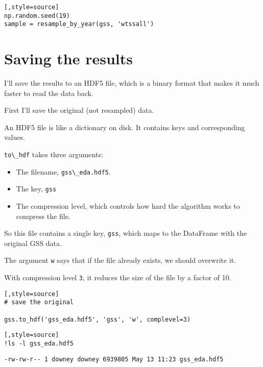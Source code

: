 \begin{lstlisting}[,style=source]
np.random.seed(19)
sample = resample_by_year(gss, 'wtssall')
\end{lstlisting}

\hypertarget{saving-the-results}{%
\section{Saving the results}\label{saving-the-results}}

I'll save the results to an HDF5 file, which is a binary format that
makes it much faster to read the data back.

First I'll save the original (not resampled) data.

An HDF5 file is like a dictionary on disk. It contains keys and
corresponding values.

\passthrough{\lstinline!to\_hdf!} takes three arguments:

\begin{itemize}
\item
  The filename, \passthrough{\lstinline!gss\_eda.hdf5!}.
\item
  The key, \passthrough{\lstinline!gss!}
\item
  The compression level, which controls how hard the algorithm works to
  compress the file.
\end{itemize}

So this file contains a single key, \passthrough{\lstinline!gss!}, which
maps to the DataFrame with the original GSS data.

The argument \passthrough{\lstinline!w!} says that if the file already
exists, we should overwrite it.

With compression level \passthrough{\lstinline!3!}, it reduces the size
of the file by a factor of 10.

\begin{lstlisting}[,style=source]
# save the original

gss.to_hdf('gss_eda.hdf5', 'gss', 'w', complevel=3)
\end{lstlisting}

\begin{lstlisting}[,style=source]
!ls -l gss_eda.hdf5
\end{lstlisting}

\begin{lstlisting}[style=output]
-rw-rw-r-- 1 downey downey 6939805 May 13 11:23 gss_eda.hdf5
\end{lstlisting}

